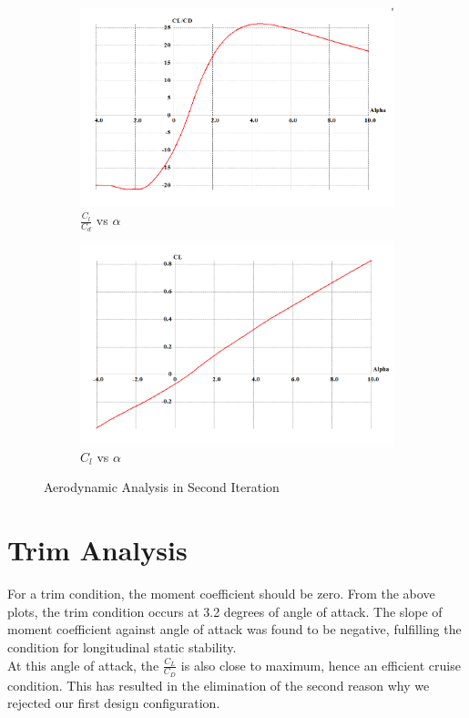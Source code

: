 \begin{figure}[H]
\medskip
\begin{subfigure}{0.6\textwidth}
\includegraphics[width = \linewidth]{clcd_vs_alpha__1_.png}
\caption{$\frac{C_l}{C_d}$ vs $\alpha$}
\end{subfigure}
\begin{subfigure}{0.6\textwidth}
\includegraphics[width = \linewidth]{cl_alpha.png}
\caption{$C_l$ vs $\alpha$}
\end{subfigure}
\caption{Aerodynamic Analysis in Second Iteration}
\end{figure}
\section{Trim Analysis}
For a trim condition, the moment coefficient should be zero. From the above plots, the trim condition occurs at 3.2 degrees of angle of attack. The slope of moment coefficient against angle of attack was found to be negative, fulfilling the condition for longitudinal static stability.\\
At this angle of attack, the $\frac{C_L}{C_D}$ is also close to maximum, hence an efficient cruise condition. This has resulted in the elimination of the second reason why we rejected our first design configuration.\\

